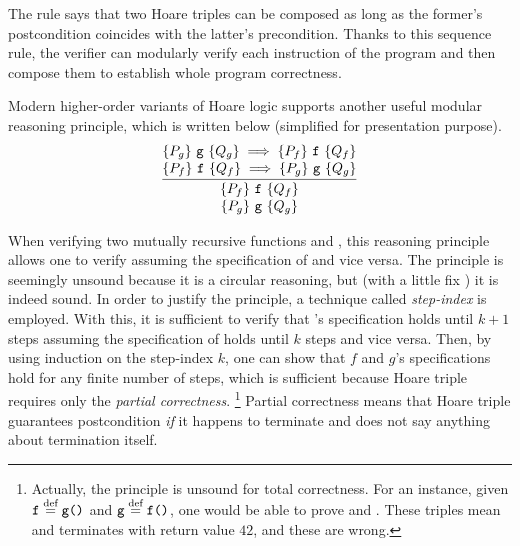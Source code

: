 \noindent The rule says that two Hoare triples can be composed as long as the former's postcondition coincides with the latter's precondition. Thanks to this sequence rule, the verifier can modularly verify each instruction of the program and then compose them to establish whole program correctness.



Modern higher-order variants of Hoare logic\cite{VST,appel:plcc} supports another useful modular reasoning principle, which is written below (simplified for presentation purpose).%
\[
\infer
    {\deduce{\hoare{P_{g}}{\code{g}}{Q_{g}}}{\hoare{P_{f}}{\code{f}}{Q_{f}}}}
    {\deduce{\hoare{P_{f}}{\code{f}}{Q_{f}} \implies \hoare{P_{g}}{\code{g}}{Q_{g}}}
            {\hoare{P_{g}}{\code{g}}{Q_{g}} \implies \hoare{P_{f}}{\code{f}}{Q_{f}}}
    }
\]

\noindent When verifying two mutually recursive functions  and , this reasoning principle allows one to verify  assuming the specification of  and vice versa.
The principle is seemingly unsound because it is a circular reasoning, but (with a little fix%
) it is indeed sound. %
In order to justify the principle, a technique called {\it step-index} is employed.
With this, it is sufficient to verify that 's specification holds until $k+1$ steps assuming the specification of  holds until $k$ steps and vice versa.
Then, by using induction on the step-index $k$, one can show that $f$ and $g$'s specifications hold for any finite number of steps, which is sufficient because Hoare triple requires only the {\it partial correctness}.
\footnote{Actually, the principle is unsound for total correctness. For an instance, given $\texttt{f} \stackrel{\text{def}}{=} \texttt{g()}$ and $\texttt{g} \stackrel{\text{def}}{=} \texttt{f()}$, one would be able to prove  and .
  These triples mean  and  terminates with return value $42$, and these are wrong. }
Partial correctness means that Hoare triple guarantees postcondition {\it if} it happens to terminate and does not say anything about termination itself.




